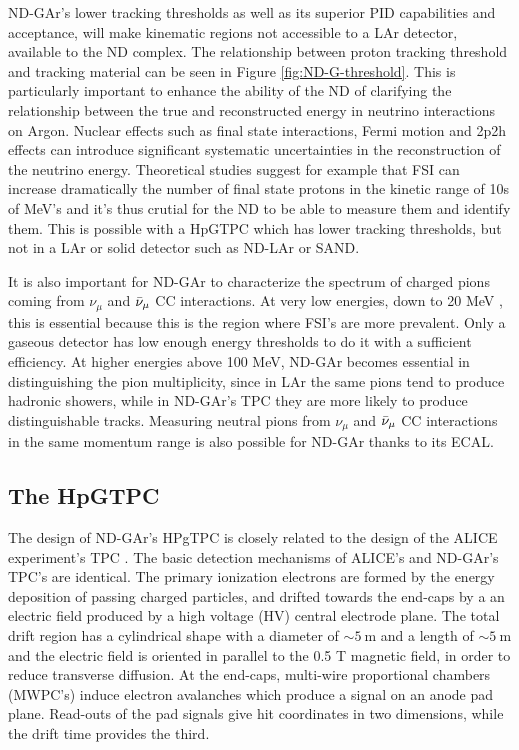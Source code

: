ND-GAr's lower tracking thresholds as well as its superior PID capabilities and acceptance, will make kinematic regions not accessible to a LAr detector, available to the ND complex. The relationship between proton tracking threshold and tracking material can be seen in Figure \ref{fig:ND-G-threshold}. This is particularly important to enhance the ability of the ND of clarifying the relationship between the true and reconstructed energy in neutrino interactions on Argon. Nuclear effects such as final state interactions, Fermi motion and 2p2h effects can introduce significant systematic uncertainties in the reconstruction of the neutrino energy. Theoretical studies suggest for example that FSI can increase dramatically the number of final state protons in the kinetic range of 10s of MeV's and it's thus crutial for the ND to be able to measure them and identify them. This is possible with a HpGTPC which has lower tracking thresholds, but not in a LAr or solid detector such as ND-LAr or SAND. 

It is also important for ND-GAr to characterize the spectrum of charged pions coming from $\nu_\mu$ and $\Bar{\nu}_\mu$ CC interactions. At very low energies, down to 20 MeV , this is essential because this is the region where FSI's are more prevalent. Only a gaseous detector has low enough energy thresholds to do it with a sufficient efficiency. At higher energies above 100 MeV, ND-GAr becomes essential in distinguishing the pion multiplicity, since in LAr the same pions tend to produce hadronic showers, while in ND-GAr's TPC they are more likely to produce distinguishable tracks. Measuring neutral pions from $\nu_\mu$ and $\Bar{\nu}_\mu$ CC interactions in the same momentum range is also possible for ND-GAr thanks to its ECAL.

\subsection{The HpGTPC}
The design of ND-GAr's HPgTPC is closely related to the design of the ALICE experiment's TPC \cite{ALICE}. The basic detection mechanisms of ALICE's and ND-GAr's TPC's are identical. The primary ionization electrons are formed by the energy deposition of passing charged particles, and drifted towards the end-caps by a an electric field produced by a high voltage (HV) central electrode plane. The total drift region has a cylindrical shape with a diameter of $\sim 5 \ \text{m}$ and a length of $\sim 5 \ \text{m}$ and the electric field is oriented in parallel to the 0.5 T magnetic field, in order to reduce transverse diffusion. At the end-caps, multi-wire proportional chambers (MWPC's) induce electron avalanches which produce a signal on an anode pad plane. Read-outs of the pad signals give hit coordinates in two dimensions, while the drift time provides the third.


